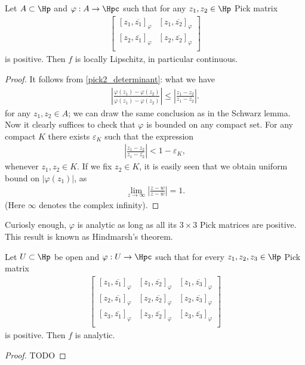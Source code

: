 \begin{lause}\label{pick_continuity_lemma}
	Let $A \subset \Hp$ and $\varphi : A \to \Hpc$ such that for any $z_{1}, z_{2} \in \Hp$ Pick matrix
	\begin{align*}
	\begin{bmatrix}
		[z_{1}, \overline{z_{1}}]_{\varphi} & [z_{1}, \overline{z_{2}}]_{\varphi}\\
		[z_{2}, \overline{z_{1}}]_{\varphi} & [z_{2}, \overline{z_{2}}]_{\varphi}\\
	\end{bmatrix}
	\end{align*}
	is positive. Then $f$ is locally Lipschitz, in particular continuous.
\end{lause}
\begin{proof}
	It follows from \ref{pick2_determinant}: what we have
	\begin{align*}
		\left|\frac{\varphi(z_{1}) - \varphi(z_{2})}{\varphi(z_{1}) - \overline{\varphi(z_{2})}} \right| \leq \left|\frac{z_{1} - z_{2}}{z_{1} - \overline{z_{2}}} \right|.
	\end{align*}
	for any $z_{1}, z_{2} \in A$; we can draw the same conclusion as in the Schwarz lemma. Now it clearly suffices to check that $\varphi$ is bounded on any compact set. For any compact $K$ there exists $\varepsilon_{K}$ such that the expression
	\begin{align*}
		\left|\frac{z_{1} - z_{2}}{z_{1} - \overline{z_{2}}} \right| < 1 - \varepsilon_{K},
	\end{align*}
	whenever $z_{1}, z_{2} \in K$. If we fix $z_{2} \in K$, it is easily seen that we obtain uniform bound on $|\varphi(z_{1})|$, as
	\begin{align*}
		\lim_{z \to \infty}  \left|\frac{z - w}{z - \overline{w}} \right| = 1.
	\end{align*}
	(Here $\infty$ denotes the complex infinity).
\end{proof}

Curiosly enough, $\varphi$ is analytic as long as all its $3 \times 3$ Pick matrices are positive. This result is known as Hindmarsh's theorem.

\begin{lause}\label{Hindmarsh_theorem}
	Let $U \subset \Hp$ be open and $\varphi : U \to \Hpc$ such that for every $z_{1}, z_{2}, z_{3} \in \Hp$ Pick matrix
	\begin{align*}
	\begin{bmatrix}
		[z_{1}, \overline{z_{1}}]_{\varphi} & [z_{1}, \overline{z_{2}}]_{\varphi} & [z_{1}, \overline{z_{3}}]_{\varphi}\\
		[z_{2}, \overline{z_{1}}]_{\varphi} & [z_{2}, \overline{z_{2}}]_{\varphi} & [z_{2}, \overline{z_{3}}]_{\varphi}\\
		[z_{3}, \overline{z_{1}}]_{\varphi} & [z_{3}, \overline{z_{2}}]_{\varphi} & [z_{3}, \overline{z_{3}}]_{\varphi}\\
	\end{bmatrix}
	\end{align*}
	is positive. Then $f$ is analytic.
\end{lause}
\begin{proof}
	TODO
\end{proof}

